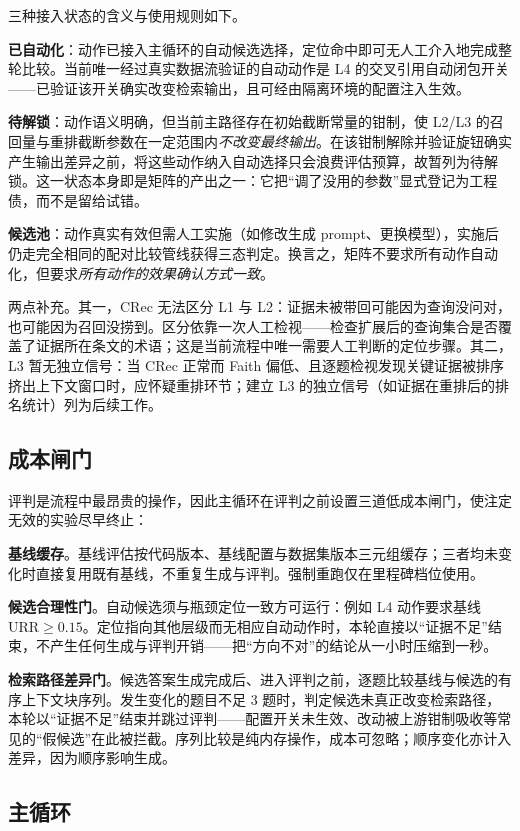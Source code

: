 \documentclass[11pt,a4paper,fontset=fandol]{ctexart}
\begin{document}
三种接入状态的含义与使用规则如下。

\textbf{已自动化}：动作已接入主循环的自动候选选择，定位命中即可无人工介入地完成整轮比较。当前唯一经过真实数据流验证的自动动作是 L4 的交叉引用自动闭包开关——已验证该开关确实改变检索输出，且可经由隔离环境的配置注入生效。

\textbf{待解锁}：动作语义明确，但当前主路径存在初始截断常量的钳制，使 L2/L3 的召回量与重排截断参数在一定范围内\emph{不改变最终输出}。在该钳制解除并验证旋钮确实产生输出差异之前，将这些动作纳入自动选择只会浪费评估预算，故暂列为待解锁。这一状态本身即是矩阵的产出之一：它把``调了没用的参数''显式登记为工程债，而不是留给试错。

\textbf{候选池}：动作真实有效但需人工实施（如修改生成 prompt、更换模型），实施后仍走完全相同的配对比较管线获得三态判定。换言之，矩阵不要求所有动作自动化，但要求\emph{所有动作的效果确认方式一致}。

两点补充。其一，CRec 无法区分 L1 与 L2：证据未被带回可能因为查询没问对，也可能因为召回没捞到。区分依靠一次人工检视——检查扩展后的查询集合是否覆盖了证据所在条文的术语；这是当前流程中唯一需要人工判断的定位步骤。其二，L3 暂无独立信号：当 CRec 正常而 Faith 偏低、且逐题检视发现关键证据被排序挤出上下文窗口时，应怀疑重排环节；建立 L3 的独立信号（如证据在重排后的排名统计）列为后续工作。

\subsection{成本闸门}
\label{sec:gates}

评判是流程中最昂贵的操作，因此主循环在评判之前设置三道低成本闸门，使注定无效的实验尽早终止：

\textbf{基线缓存}。基线评估按代码版本、基线配置与数据集版本三元组缓存；三者均未变化时直接复用既有基线，不重复生成与评判。强制重跑仅在里程碑档位使用。

\textbf{候选合理性门}。自动候选须与瓶颈定位一致方可运行：例如 L4 动作要求基线 $\mathrm{URR}\ge 0.15$。定位指向其他层级而无相应自动动作时，本轮直接以``证据不足''结束，不产生任何生成与评判开销——把``方向不对''的结论从一小时压缩到一秒。

\textbf{检索路径差异门}。候选答案生成完成后、进入评判之前，逐题比较基线与候选的有序上下文块序列。发生变化的题目不足 3 题时，判定候选未真正改变检索路径，本轮以``证据不足''结束并跳过评判——配置开关未生效、改动被上游钳制吸收等常见的``假候选''在此被拦截。序列比较是纯内存操作，成本可忽略；顺序变化亦计入差异，因为顺序影响生成。

\subsection{主循环}
\end{document}
